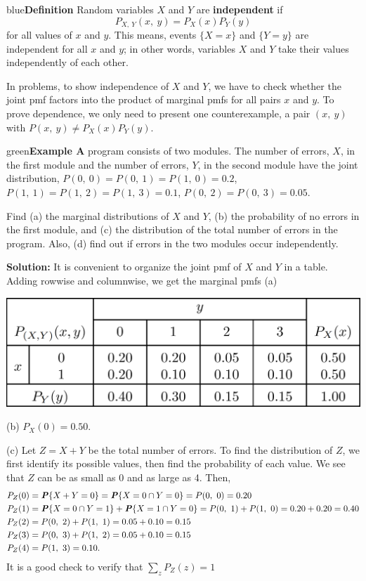 \documentclass{article}
\newenvironment{example}[1]{\begin{mybox}{green}{\textbf{Example #1}}}{\end{mybox}}
\newenvironment{definition}[1]{\begin{mybox}{blue}{\textbf{Definition #1}}}{\end{mybox}}
\newcommand{\prob}[1]{\textbf{\textit{P}}\{#1\}}
\begin{document}
\begin{definition}{}
Random variables $X$ and $Y$ are \textbf{independent} if
\begin{equation*}
    P_{X,\ Y}(x,\ y) = P_X(x) P_Y(y)
\end{equation*}
for all values of $x$ and $y$. This means, events $\{X = x\}$ and $\{Y = y\}$ are independent for all $x$ and $y$; in other words, variables $X$ and $Y$ take their values independently of each other.
\end{definition}
In problems, to show independence of $X$ and $Y$, we have to check whether the joint pmf factors into the product of marginal pmfs for all pairs $x$ and $y$. To prove dependence, we only need to present one counterexample, a pair $(x,\ y)$ with $P(x,\ y) \neq P_X(x) P_Y(y)$.

\begin{example}{2}
A program consists of two modules. The number of errors, $X$, in the first module and the number of errors, $Y$, in the second module have the joint distribution, $P(0,\ 0) = P(0,\ 1) = P(1,\ 0) = 0.2$, $P(1,\ 1) = P(1,\ 2) = P(1,\ 3) = 0.1$, $P(0,\ 2) = P(0,\ 3) = 0.05$. 

Find (a) the marginal distributions of $X$ and $Y$, (b) the probability of no errors in the first module, and (c) the distribution of the total number of errors in the program. Also, (d) find out if errors in the two modules occur independently.

\textbf{Solution:} It is convenient to organize the joint pmf of $X$ and $Y$ in a table. Adding rowwise and columnwise, we get the marginal pmfs (a)
\begin{center}
\includegraphics[width=.5\textwidth]{img/table-ex3.6.png}
\end{center}
(b) $P_X (0) = 0.50$.

(c) Let $Z = X + Y$ be the total number of errors. To find the distribution of $Z$, we first identify its possible values, then find the probability of each value. We see that $Z$ can be as small as 0 and as large as 4. Then,
\begin{align*}
    P_Z(0) &= \prob{X + Y = 0} = \prob{X = 0 \cap Y = 0} = P(0,\ 0) = 0.20\\
    P_Z(1) &= \prob{X = 0 \cap Y = 1} + \prob{X = 1 \cap Y = 0} = P(0,\ 1) + P(1,\ 0) = 0.20 + 0.20 = 0.40\\
    P_Z(2) &= P(0,\ 2) + P(1,\ 1) = 0.05 + 0.10 = 0.15\\
    P_Z(3) &= P(0,\ 3) + P(1,\ 2) = 0.05 + 0.10 = 0.15\\
    P_Z(4) &= P(1,\ 3) = 0.10.
\end{align*}
It is a good check to verify that $\sum_z P_Z(z) = 1$


\end{example}
\end{document}
